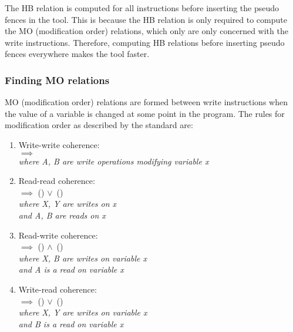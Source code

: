 %	

\par
The HB relation is computed for all instructions before inserting the pseudo fences in the tool. This is because the HB relation is only required to compute the MO (modification order) relations, which only are only concerned with the write instructions. Therefore, computing HB relations before inserting pseudo fences everywhere makes the tool faster.

\subsubsection{Finding MO relations}
MO (modification order) relations are formed between write instructions when the value of a variable is changed at some point in the program. The rules for modification order as described by the standard are:
\begin{enumerate}
    \item Write-write coherence: \\
     $\implies$ \\
    \textit{where A, B are write operations modifying variable x}
    
    \item Read-read coherence:\\
     $\implies$ () $\lor$\ ()\\
    \textit{where X, Y are writes on x\\ and A, B are reads on x}
    
    \item Read-write coherence:\\
     $\implies$ () $\land$\ ()\\
    \textit{where X, B are writes on variable x\\and A is a read on variable x}
    
    \item Write-read coherence:\\
     $\implies$ () $\lor$\ ()\\
    \textit{where X, Y are writes on variable x\\and B is a read on variable x}
\end{enumerate}

